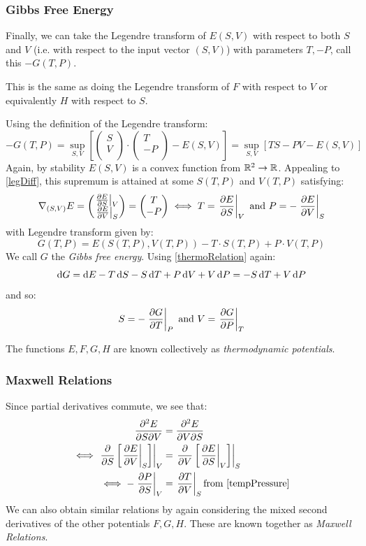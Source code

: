 \documentclass[../main.tex]{subfiles}
\begin{document}
\subsubsection{Gibbs Free Energy}
Finally, we can take the Legendre transform of $E(S, V)$ with respect to both $S$ and $V$ (i.e. with respect to the input vector $(S, V)$) with parameters $T, -P$, call this $-G(T, P)$.
\begin{remark}
  This is the same as doing the Legendre transform of $F$ with respect to $V$ or equivalently $H$ with respect to $S$.
\end{remark}
Using the definition of the Legendre transform:
\[
  -G(T, P) = \sup_{S, V} \left[\begin{pmatrix}
  S \\
  V \\
  \end{pmatrix} \cdot \begin{pmatrix}
  T \\
  -P \\
  \end{pmatrix} - E(S, V)\right] = \sup_{S, V} [TS - PV - E(S, V)]
\]
Again, by stability $E(S, V)$ is a convex function from $\mathbb{R}^2 \to \mathbb{R}$.
Appealing to \cref{legDiff}, this supremum is attained at some $S(T, P)$ and $V(T, P)$ satisfying:
\[
  \nabla_{(S, V)} E = \begin{pmatrix}
  \at{\pderiv{E}{S}}{V} \\
  \at{\pderiv{E}{V}}{S} \\
  \end{pmatrix} = \begin{pmatrix}
  T \\
  -P \\
  \end{pmatrix} \iff
  T = \at{\pderiv{E}{S}}{V} \text{ and } P = - \at{\pderiv{E}{V}}{S}
\]
with Legendre transform given by:
\[
  G(T, P) = E(S(T, P), V(T, P)) - T \cdot S(T, P) + P \cdot V(T, P)
\]
We call $G$ the \textit{Gibbs free energy}.
Using \cref{thermoRelation} again:
\[
  \d{G} = \d{E} - T \d{S} - S \d{T} + P \d{V} + V \d{P} = - S \d{T} + V \d{P}
\]
and so:
\[
  S = - \at{\pderiv{G}{T}}{P} \text{ and } V = \at{\pderiv{G}{P}}{T}
\]
\begin{remark}
  The functions $E, F, G, H$ are known collectively as \textit{thermodynamic potentials}.
\end{remark}
\subsubsection{Maxwell Relations}
Since partial derivatives commute, we see that:
\begin{align*}
  \frac{\partial^2 E}{\partial S \partial V} &= \frac{\partial^2 E}{\partial V \partial S} \\
  \iff \at{\pderiv{}{S}\left[\at{\pderiv{E}{V}}{S}\right]}{V} &= \at{\pderiv{}{V}\left[\at{\pderiv{E}{S}}{V}\right]}{S} \\
  \iff -\at{\pderiv{P}{S}}{V} &= \at{\pderiv{T}{V}}{S} \text{from \cref{tempPressure}}
\end{align*}
We can also obtain similar relations by again considering the mixed second derivatives of the other potentials $F, G, H$.
These are known together as \textit{Maxwell Relations}.
\end{document}
